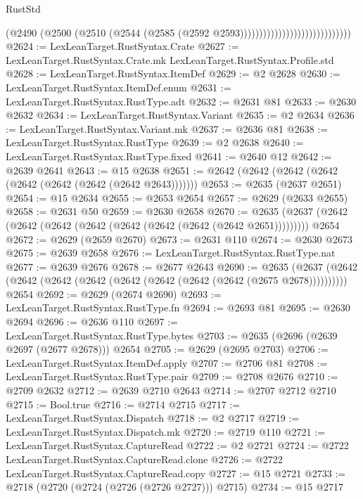 \begin{lexlean}{RustStd}
\begin{coremodule}
                                                  (@2490
                                                    (@2500
                                                      (@2510
                                                        (@2544
                                                          (@2585
                                                            (@2592
                                                              @2593)))))))))))))))))))))))))))))
@2624 := LexLeanTarget.RustSyntax.Crate
@2627 := LexLeanTarget.RustSyntax.Crate.mk LexLeanTarget.RustSyntax.Profile.std
@2628 := LexLeanTarget.RustSyntax.ItemDef
@2629 := @2 @2628
@2630 := LexLeanTarget.RustSyntax.ItemDef.enum
@2631 := LexLeanTarget.RustSyntax.RustType.adt
@2632 := @2631 @81
@2633 := @2630 @2632
@2634 := LexLeanTarget.RustSyntax.Variant
@2635 := @2 @2634
@2636 := LexLeanTarget.RustSyntax.Variant.mk
@2637 := @2636 @81
@2638 := LexLeanTarget.RustSyntax.RustType
@2639 := @2 @2638
@2640 := LexLeanTarget.RustSyntax.RustType.fixed
@2641 := @2640 @12
@2642 := @2639 @2641
@2643 := @15 @2638
@2651 := @2642 (@2642 (@2642 (@2642 (@2642 (@2642 (@2642 (@2642 @2643)))))))
@2653 := @2635 (@2637 @2651)
@2654 := @15 @2634
@2655 := @2653 @2654
@2657 := @2629 (@2633 @2655)
@2658 := @2631 @50
@2659 := @2630 @2658
@2670 := @2635 (@2637 (@2642 (@2642 (@2642 (@2642 (@2642 (@2642 (@2642 (@2642 @2651))))))))) @2654
@2672 := @2629 (@2659 @2670)
@2673 := @2631 @110
@2674 := @2630 @2673
@2675 := @2639 @2658
@2676 := LexLeanTarget.RustSyntax.RustType.nat
@2677 := @2639 @2676
@2678 := @2677 @2643
@2690 := @2635
    (@2637 (@2642 (@2642 (@2642 (@2642 (@2642 (@2642 (@2642 (@2642 (@2675 @2678))))))))))
    @2654
@2692 := @2629 (@2674 @2690)
@2693 := LexLeanTarget.RustSyntax.RustType.fn
@2694 := @2693 @81
@2695 := @2630 @2694
@2696 := @2636 @110
@2697 := LexLeanTarget.RustSyntax.RustType.bytes
@2703 := @2635 (@2696 (@2639 @2697 (@2677 @2678))) @2654
@2705 := @2629 (@2695 @2703)
@2706 := LexLeanTarget.RustSyntax.ItemDef.apply
@2707 := @2706 @81
@2708 := LexLeanTarget.RustSyntax.RustType.pair
@2709 := @2708 @2676
@2710 := @2709 @2632
@2712 := @2639 @2710 @2643
@2714 := @2707 @2712 @2710
@2715 := Bool.true
@2716 := @2714 @2715
@2717 := LexLeanTarget.RustSyntax.Dispatch
@2718 := @2 @2717
@2719 := LexLeanTarget.RustSyntax.Dispatch.mk
@2720 := @2719 @110
@2721 := LexLeanTarget.RustSyntax.CaptureRead
@2722 := @2 @2721
@2724 := @2722 LexLeanTarget.RustSyntax.CaptureRead.clone
@2726 := @2722 LexLeanTarget.RustSyntax.CaptureRead.copy
@2727 := @15 @2721
@2733 := @2718 (@2720 (@2724 (@2726 (@2726 @2727))) @2715)
@2734 := @15 @2717

\end{coremodule}
\end{lexlean}
